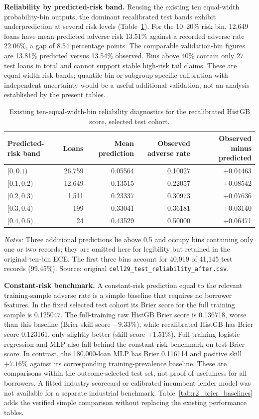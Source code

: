 \documentclass[10pt]{article}
\begin{document}
\noindent\textbf{Reliability by predicted-risk band.} Reusing the existing ten equal-width probability-bin outputs, the dominant recalibrated test bands exhibit underprediction at several risk levels (Table~\ref{tab:r2_reliability_bins}). For the 10--20\% risk bin, 12,649 loans have mean predicted adverse risk 13.51\% against a recorded adverse rate 22.06\%, a gap of 8.54 percentage points. The comparable validation-bin figures are 13.81\% predicted versus 13.54\% observed. Bins above 40\% contain only 27 test loans in total and cannot support stable high-risk tail claims. These are equal-width risk bands; quantile-bin or subgroup-specific calibration with independent uncertainty would be a useful additional validation, not an analysis established by the present tables.

\begin{table}[!ht]
\centering
\caption{Existing ten-equal-width-bin reliability diagnostics for the recalibrated HistGB score, selected test cohort.}
\label{tab:r2_reliability_bins}
\begin{tabular}{lrrrr}
\toprule
Predicted-risk band & Loans & Mean prediction & Observed adverse rate & Observed minus predicted \\
\midrule
$[0,0.1)$ & 26,759 & 0.05564 & 0.10027 & +0.04463 \\
$[0.1,0.2)$ & 12,649 & 0.13515 & 0.22057 & +0.08542 \\
$[0.2,0.3)$ & 1,511 & 0.23337 & 0.30973 & +0.07636 \\
$[0.3,0.4)$ & 199 & 0.33041 & 0.36181 & +0.03140 \\
$[0.4,0.5)$ & 24 & 0.43529 & 0.50000 & +0.06471 \\
\bottomrule
\end{tabular}
\vspace{2pt}
{\footnotesize \textit{Notes:} Three additional predictions lie above 0.5 and occupy bins containing only one or two records; they are omitted here for legibility but retained in the original ten-bin ECE. The first three bins account for 40,919 of 41,145 test records (99.45\%). Source: original \texttt{cell29\_test\_reliability\_after.csv}.}
\end{table}


\noindent\textbf{Constant-risk benchmark.} A constant-risk prediction equal to the relevant training-sample adverse rate is a simple baseline that requires no borrower features. In the fixed selected test cohort its Brier score for the full training sample is 0.125047. The full-training raw HistGB Brier score is 0.136718, worse than this baseline (Brier skill score $-9.33\%$), while recalibrated HistGB has Brier score 0.123161, only slightly better (skill score $+1.51\%$). Full-training logistic regression and MLP also fall behind the constant-risk benchmark on test Brier score. In contrast, the 180,000-loan MLP has Brier 0.116114 and positive skill $+7.16\%$ against its corresponding training-prevalence baseline. These are comparisons within the outcome-selected test set, not proof of usefulness for all borrowers. A fitted industry scorecard or calibrated incumbent lender model was not available for a separate industrial benchmark. Table~\ref{tab:r2_brier_baselines} adds the verified simple comparison without replacing the existing performance tables.
\end{document}
